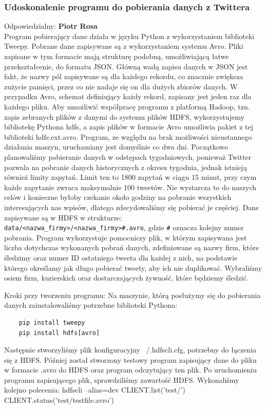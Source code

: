 \documentclass[a4paper,11pt, notitlepage ]{article}
\begin{document}
    \subsubsection{Udoskonalenie programu do pobierania danych z Twittera} 
    Odpowiedzialny: \textbf{Piotr Rosa} \\
    Program pobierający dane działa w języku Python z wykorzystaniem biblioteki Tweepy. Pobrane dane zapisywane są z wykorzystaniem systemu Avro. Pliki zapisane w tym formacie mają strukturę podobną, umożliwiającą łatwe przekształcenie, do formatu JSON. Główną wadą zapisu danych w JSON jest fakt, że nazwy pól zapisywane są dla każdego rekordu, co znacznie zwiększa zużycie pamięci, przez co nie nadaje się on dla dużych zbiorów danych. W przypadku Avro, schemat definiujący każdy rekord, zapisany jest jeden raz dla każdego pliku. Aby umożliwić współpracę programu z platformą Hadoop, tzn. zapis zebranych plików z danymi do systemu plików HDFS, wykorzystujemy bibliotekę Pythona hdfs, a zapis plików w formacie Avro umożliwia pakiet z tej biblioteki hdfs.ext.avro.
    Program, ze względu na brak możliwości nieustannego działania maszyn, uruchamiany jest domyślnie co dwa dni. Początkowo planowaliśmy pobieranie danych w odstępach tygodniowych, ponieważ Twitter pozwala na pobranie danych historycznych z okresu tygodnia, jednak istnieją również limity zapytań. Limit ten to 1800 zapytań w ciągu 15 minut, przy czym każde zapytanie zwraca maksymalnie 100 tweetów. Nie wystarcza to do naszych celów i konieczne byłoby czekanie około godziny na pobranie wszystkich interesujących nas wpisów, dlatego zdecydowaliśmy się pobierać je częściej. Dane zapisywane są w HDFS w strukturze: \texttt{data/<nazwa\_firmy>/<nazwa\_firmy>\#.avro}, gdzie \texttt{\#} oznacza kolejny numer pobrania. Program wykorzystuje pomocniczy plik, w którym zapisywana jest liczba dotychczas wykonanych pobrań danych, zdefiniowane są nazwy firm, które śledzimy oraz numer ID ostatniego tweeta dla każdej z nich, na podstawie którego określamy jak długo pobierać tweety, aby ich nie duplikować. Wybraliśmy osiem firm, kurierskich oraz dostarczających żywność, które będziemy śledzić.

    Kroki przy tworzeniu programu:
    Na maszynie, którą posłużymy się do pobierania danych zainstalowaliśmy potrzebne biblioteki Pythona:

    \begin{verbatim}
    pip install tweepy
    pip install hdfs[avro]
    \end{verbatim}
    Następnie stworzyliśmy plik konfiguracyjny ~/.hdfscli.cfg, potrzebny do łączenia się z HDFS.
    Później został stworzony testowy program zapisujący dane do pliku w formacie .avro do HDFS oraz program odczytujący ten plik. Po uruchomieniu programu zapisującego plik, sprawdziliśmy zawartość HDFS.
    Wykonaliśmy kolejno polecenia:
    hdfscli --alias=dev
    CLIENT.list('test/')
    CLIENT.status('test/testfile.avro')
\end{document}
